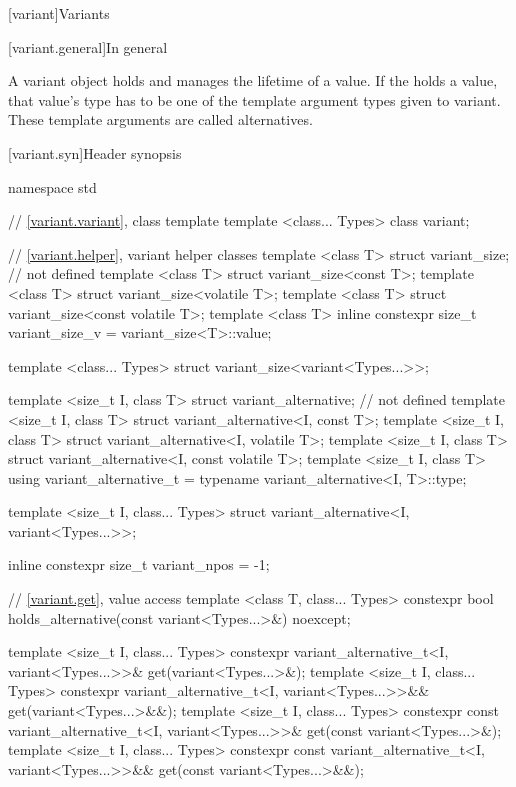 [variant]{Variants}

[variant.general]{In general}

\pnum
A variant object holds and manages the lifetime of a value.
If the  holds a value, that value's type has to be one
of the template argument types given to variant.
These template arguments are called alternatives.

[variant.syn]{Header  synopsis}
%
%

\begin{codeblock}
namespace std {
  // \ref{variant.variant}, class template 
  template <class... Types>
    class variant;

  // \ref{variant.helper}, variant helper classes
  template <class T> struct variant_size;                   // not defined
  template <class T> struct variant_size<const T>;
  template <class T> struct variant_size<volatile T>;
  template <class T> struct variant_size<const volatile T>;
  template <class T>
    inline constexpr size_t variant_size_v = variant_size<T>::value;

  template <class... Types>
    struct variant_size<variant<Types...>>;

  template <size_t I, class T> struct variant_alternative;  // not defined
  template <size_t I, class T> struct variant_alternative<I, const T>;
  template <size_t I, class T> struct variant_alternative<I, volatile T>;
  template <size_t I, class T> struct variant_alternative<I, const volatile T>;
  template <size_t I, class T>
    using variant_alternative_t = typename variant_alternative<I, T>::type;

  template <size_t I, class... Types>
    struct variant_alternative<I, variant<Types...>>;

  inline constexpr size_t variant_npos = -1;

  // \ref{variant.get}, value access
  template <class T, class... Types>
    constexpr bool holds_alternative(const variant<Types...>&) noexcept;

  template <size_t I, class... Types>
    constexpr variant_alternative_t<I, variant<Types...>>& get(variant<Types...>&);
  template <size_t I, class... Types>
    constexpr variant_alternative_t<I, variant<Types...>>&& get(variant<Types...>&&);
  template <size_t I, class... Types>
    constexpr const variant_alternative_t<I, variant<Types...>>& get(const variant<Types...>&);
  template <size_t I, class... Types>
    constexpr const variant_alternative_t<I, variant<Types...>>&& get(const variant<Types...>&&);

}
\end{codeblock}
